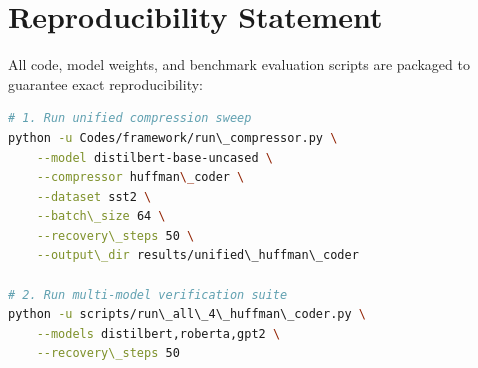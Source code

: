 \section{Reproducibility Statement}
All code, model weights, and benchmark evaluation scripts are packaged to guarantee exact reproducibility:
\begin{lstlisting}[language=bash]
# 1. Run unified compression sweep
python -u Codes/framework/run\_compressor.py \
    --model distilbert-base-uncased \
    --compressor huffman\_coder \
    --dataset sst2 \
    --batch\_size 64 \
    --recovery\_steps 50 \
    --output\_dir results/unified\_huffman\_coder

# 2. Run multi-model verification suite
python -u scripts/run\_all\_4\_huffman\_coder.py \
    --models distilbert,roberta,gpt2 \
    --recovery\_steps 50
\end{lstlisting}
